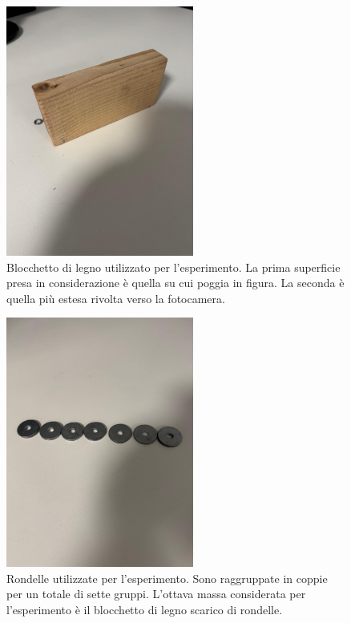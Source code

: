 \documentclass[11pt]{article}
\begin{document}
\begin{figure}[H]
  \centering
  \includegraphics[width=0.55\textwidth]{legno.jpg}
  \caption{Blocchetto di legno utilizzato per l'esperimento. La prima superficie presa in considerazione è quella su cui poggia in figura. La seconda è quella più estesa rivolta verso la fotocamera.}
\end{figure}
\begin{figure}[H]
  \centering
  \includegraphics[width=0.55\textwidth]{rondelle.jpg}
  \caption{Rondelle utilizzate per l'esperimento. Sono raggruppate in coppie per un totale di sette gruppi. L'ottava massa considerata per l'esperimento è il blocchetto di legno scarico di rondelle.}
\end{figure}
\end{document}
